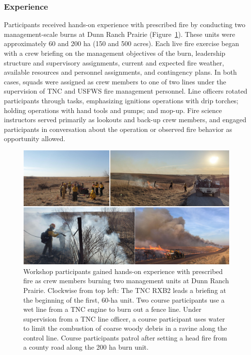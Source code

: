 \documentclass[fire,casereport,accept,moreauthors,pdftex]{Definitions/mdpi}  %
\begin{document}
\subsubsection{Experience}

Participants received hands-on experience with prescribed fire by conducting two management-scale burns at Dunn Ranch Prairie (Figure~\ref{FireExperience}).
These units were approximately 60 and 200 ha (150 and 500 acres).
Each live fire exercise began with a crew briefing on the management objectives of the burn, leadership structure and supervisory assignments, current and expected fire weather, available resources and personnel assignments, and contingency plans.
In both cases, squads were assigned as crew members to one of two lines under the supervision of TNC and USFWS fire management personnel.
Line officers rotated participants through tasks, emphasizing ignitions operations with drip torches; holding operations with hand tools and pumps; and mop-up.
Fire science instructors served primarily as lookouts and back-up crew members, and engaged participants in conversation about the operation or observed fire behavior as opportunity allowed.


\begin{figure}[H]
\centering
\includegraphics[width=1\columnwidth]{FireExperience.pdf}
\caption{Workshop participants gained hands-on experience with prescribed fire as crew members burning two management units at Dunn Ranch Prairie. Clockwise from top left: The TNC RXB2 leads a briefing at the beginning of the first, 60-ha unit. Two course participants use a wet line from a TNC engine to burn out a fence line. Under supervision from a TNC line officer, a course participant uses water to limit the combustion of coarse woody debris in a ravine along the control line. Course participants patrol after setting a head fire from a county road along the 200 ha burn unit.}
\label{FireExperience}
\end{figure}
\end{document}

